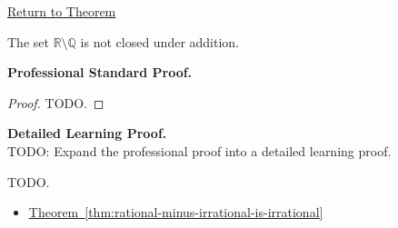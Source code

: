 \newpage
{}
\label{prf:irrationals-not-closed-under-addition}

\begin{remark*}[Return]
\hyperref[cor:irrationals-not-closed-under-addition]{Return to Theorem}
\end{remark*}

\begin{theorem*}
The set $\mathbb{R}\setminus\mathbb{Q}$ is not closed under addition.
\end{theorem*}

\textbf{Professional Standard Proof.}~\\
\begin{proof}
TODO.
\end{proof}

\textbf{Detailed Learning Proof.}~\\
TODO: Expand the professional proof into a detailed learning proof.


\begin{remark*}
TODO.
\end{remark*}

\begin{dependencies}
\begin{itemize}
  \item \hyperref[thm:rational-minus-irrational-is-irrational]{Theorem~\ref*{thm:rational-minus-irrational-is-irrational}}
\end{itemize}
\end{dependencies}

